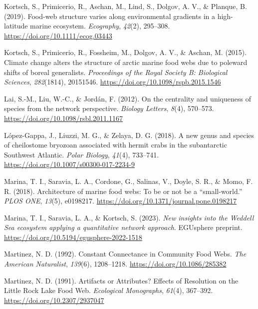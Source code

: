\documentclass[preprint, 3p,
authoryear]{elsarticle} %
\newlength{\cslhangindent}
\newlength{\cslentryspacingunit} %
\newenvironment{CSLReferences}[2] %
 {%
  \setlength{\parindent}{0pt}
  \ifodd #1
  \let\oldpar\par
  \def\par{\hangindent=\cslhangindent\oldpar}
  \fi
  \setlength{\parskip}{#2\cslentryspacingunit}
 }%
 {}
\begin{document}
\begin{CSLReferences}{1}{0}
\leavevmode{}%
Kortsch, S., Primicerio, R., Aschan, M., Lind, S., Dolgov, A. V., \&
Planque, B. (2019). Food-web structure varies along environmental
gradients in a high-latitude marine ecosystem. \emph{Ecography},
\emph{42}(2), 295--308. \url{https://doi.org/10.1111/ecog.03443}

\leavevmode{}%
Kortsch, S., Primicerio, R., Fossheim, M., Dolgov, A. V., \& Aschan, M.
(2015). Climate change alters the structure of arctic marine food webs
due to poleward shifts of boreal generalists. \emph{Proceedings of the
Royal Society B: Biological Sciences}, \emph{282}(1814), 20151546.
\url{https://doi.org/10.1098/rspb.2015.1546}

\leavevmode{}%
Lai, S.-M., Liu, W.-C., \& Jordán, F. (2012). On the centrality and
uniqueness of species from the network perspective. \emph{Biology
Letters}, \emph{8}(4), 570--573.
\url{https://doi.org/10.1098/rsbl.2011.1167}

\leavevmode{}%
López-Gappa, J., Liuzzi, M. G., \& Zelaya, D. G. (2018). A new genus and
species of cheilostome bryozoan associated with hermit crabs in the
subantarctic {Southwest Atlantic}. \emph{Polar Biology}, \emph{41}(4),
733--741. \url{https://doi.org/10.1007/s00300-017-2234-9}

\leavevmode{}%
Marina, T. I., Saravia, L. A., Cordone, G., Salinas, V., Doyle, S. R.,
\& Momo, F. R. (2018). Architecture of marine food webs: {To} be or not
be a {``small-world.''} \emph{PLOS ONE}, \emph{13}(5), e0198217.
\url{https://doi.org/10.1371/journal.pone.0198217}

\leavevmode{}%
Marina, T. I., Saravia, L. A., \& Kortsch, S. (2023). \emph{New insights
into the {Weddell Sea} ecosystem applying a quantitative network
approach}. {EGUsphere preprint}.
\url{https://doi.org/10.5194/egusphere-2022-1518}

\leavevmode{}%
Martinez, N. D. (1992). Constant {Connectance} in {Community Food Webs}.
\emph{The American Naturalist}, \emph{139}(6), 1208--1218.
\url{https://doi.org/10.1086/285382}

\leavevmode{}%
Martinez, N. D. (1991). Artifacts or {Attributes}? {Effects} of
{Resolution} on the {Little Rock Lake Food Web}. \emph{Ecological
Monographs}, \emph{61}(4), 367--392.
\url{https://doi.org/10.2307/2937047}


\end{CSLReferences}
\end{document}
